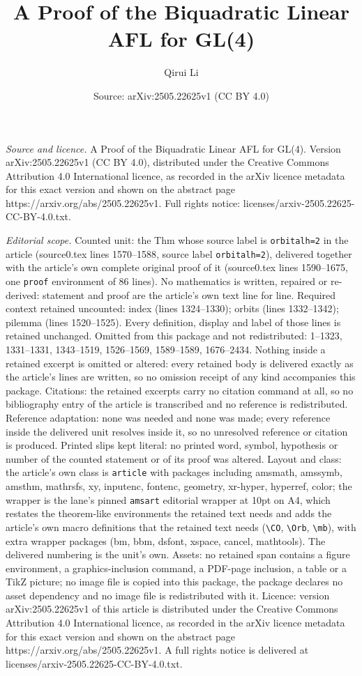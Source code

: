 \documentclass[10pt,a4paper]{amsart}
\title[A Proof of the Biquadratic Linear AFL for GL(4)]{A Proof of the Biquadratic Linear AFL for GL(4)}
\author{Qirui Li}
\date{Source: arXiv:2505.22625v1 (CC BY 4.0)}
\begin{document}
\maketitle

\noindent\emph{Source and licence.} A Proof of the Biquadratic Linear AFL for GL(4). Version arXiv:2505.22625v1 (CC BY 4.0), distributed under the Creative Commons Attribution 4.0 International licence, as recorded in the arXiv licence metadata for this exact version and shown on the abstract page https://arxiv.org/abs/2505.22625v1. Full rights notice: licenses/arxiv-2505.22625-CC-BY-4.0.txt.\par\smallskip

\noindent\textit{Editorial scope.} Counted unit: the Thm whose source label is \texttt{orbitalh=2} in the article (source0.tex lines 1570--1588, source label \texttt{orbitalh=2}), delivered together with the article's own complete original proof of it (source0.tex lines 1590--1675, one \texttt{proof} environment of 86 lines). No mathematics is written, repaired or re-derived: statement and proof are the article's own text line for line. Required context retained uncounted: index (lines 1324--1330); orbits (lines 1332--1342); pilemma (lines 1520--1525). Every definition, display and label of those lines is retained unchanged. Omitted from this package and not redistributed: 1--1323, 1331--1331, 1343--1519, 1526--1569, 1589--1589, 1676--2434. Nothing inside a retained excerpt is omitted or altered: every retained body is delivered exactly as the article's lines are written, so no omission receipt of any kind accompanies this package. Citations: the retained excerpts carry no citation command at all, so no bibliography entry of the article is transcribed and no reference is redistributed. Reference adaptation: none was needed and none was made; every reference inside the delivered unit resolves inside it, so no unresolved reference or citation is produced. Printed slips kept literal: no printed word, symbol, hypothesis or number of the counted statement or of its proof was altered. Layout and class: the article's own class is \texttt{article} with packages including amsmath, amssymb, amsthm, mathrsfs, xy, inputenc, fontenc, geometry, xr-hyper, hyperref, color; the wrapper is the lane's pinned \texttt{amsart} editorial wrapper at 10pt on A4, which restates the theorem-like environments the retained text needs and adds the article's own macro definitions that the retained text needs (\texttt{\textbackslash CO}, \texttt{\textbackslash Orb}, \texttt{\textbackslash mb}), with extra wrapper packages (bm, bbm, dsfont, xspace, cancel, mathtools). The delivered numbering is the unit's own. Assets: no retained span contains a figure environment, a graphics-inclusion command, a PDF-page inclusion, a table or a TikZ picture; no image file is copied into this package, the package declares no asset dependency and no image file is redistributed with it. Licence: version arXiv:2505.22625v1 of this article is distributed under the Creative Commons Attribution 4.0 International licence, as recorded in the arXiv licence metadata for this exact version and shown on the abstract page https://arxiv.org/abs/2505.22625v1. A full rights notice is delivered at licenses/arxiv-2505.22625-CC-BY-4.0.txt. 
\end{document}
